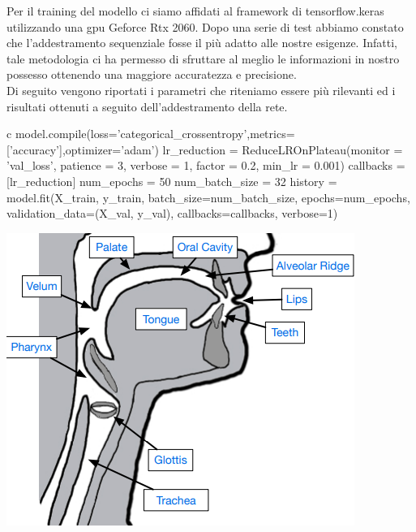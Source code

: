 \documentclass[12pt, a4paper]{article}
\begin{document}
Per il training del modello ci siamo affidati al framework di tensorflow.keras utilizzando una gpu Geforce Rtx 2060. Dopo una serie di test abbiamo constato che l'addestramento sequenziale fosse il più adatto alle nostre esigenze. Infatti, tale metodologia ci ha permesso di sfruttare al meglio le informazioni in nostro possesso ottenendo una maggiore accuratezza e precisione.\\
Di seguito vengono riportati i parametri che riteniamo essere più rilevanti ed i risultati ottenuti a seguito dell'addestramento della rete. 
\begin{code}
\label{code:python-code}
\begin{pythoncode}{c}
model.compile(loss='categorical_crossentropy',metrics=['accuracy'],optimizer='adam')
lr_reduction = ReduceLROnPlateau(monitor = 'val_loss',
                                 patience = 3,
                                 verbose = 1,
                                 factor = 0.2,
                                 min_lr = 0.001)
callbacks = [lr_reduction]
num_epochs = 50
num_batch_size = 32
history = model.fit(X_train,
          y_train,
          batch_size=num_batch_size,
          epochs=num_epochs,
          validation_data=(X_val, y_val),
          callbacks=callbacks,
          verbose=1)
\end{pythoncode}
\end{code}
\begin{minipage}{0.4\textwidth}
\includegraphics[width=\linewidth]{img/VocalBiologicalTraits.png}
\end{minipage}
\end{document}
